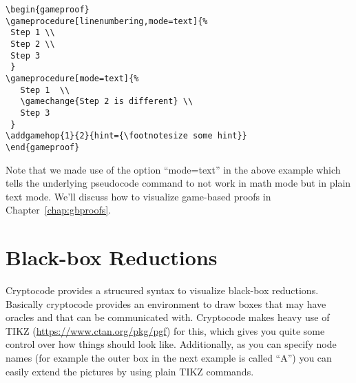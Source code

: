\documentclass[a4paper]{report}
\begin{document}
\vspace{2\baselineskip}
\begin{center}
\begin{gameproof}
\end{gameproof}
\end{center}
\begin{lstlisting}
\begin{gameproof}
\gameprocedure[linenumbering,mode=text]{%
 Step 1 \\
 Step 2 \\
 Step 3  
 }
\gameprocedure[mode=text]{%
   Step 1  \\
   \gamechange{Step 2 is different} \\
   Step 3
 }
\addgamehop{1}{2}{hint={\footnotesize some hint}}
\end{gameproof}
\end{lstlisting}
Note that we made use of the option \enquote{mode=text} in the above example which tells the underlying pseudocode 
command to not work in math mode but in plain text mode. We'll discuss how to visualize game-based proofs in Chapter~\ref{chap:gbproofs}.

\section{Black-box Reductions}
Cryptocode provides a strucured syntax to visualize black-box reductions. Basically cryptocode
provides an environment to draw boxes that may have oracles and that can be communicated with.
Cryptocode makes heavy use of TIKZ (\url{https://www.ctan.org/pkg/pgf}) for this, which gives you 
quite some control over how things should look like. Additionally, as you can specify node names
(for example the outer box in the next example is called \enquote{A}) you can easily extend the pictures
by using plain TIKZ commands.
\end{document}
